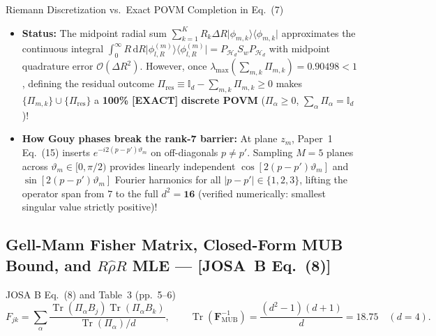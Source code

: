 \documentclass[10pt,letterpaper]{article}
\newcommand{\ket}[1]{\lvert #1 \rangle}
\newcommand{\bra}[1]{\langle #1 \rvert}
\newcommand{\abs}[1]{\lvert #1 \rvert}
\newcommand{\dd}{\mathrm{d}}
\newcommand{\josb}[1]{\textbf{[JOSA~B Eq.~(#1)]}}
\newcommand{\tagexact}{\textcolor{forest}{\textbf{[EXACT]}}}
\numberwithin{equation}{section}
\begin{document}
\begin{approxbox}{Riemann Discretization vs.\ Exact POVM Completion in Eq.~(7)}
\begin{itemize}[leftmargin=1.4em,itemsep=2pt,topsep=1pt]
  \item \textbf{Status:} The midpoint radial sum $\sum_{k=1}^K R_k\Delta R\ket{\phi_{m,k}}\bra{\phi_{m,k}}$ approximates the continuous integral $\int_0^\infty R\,\dd R\ket{\phi_{l,R}^{(m)}}\bra{\phi_{l,R}^{(m)}} = P_{\mathcal{H}_d} S_w P_{\mathcal{H}_d}$ with midpoint quadrature error $\mathcal{O}(\Delta R^2)$. However, once $\lambda_{\max}(\sum_{m,k}\Pi_{m,k}) = 0.90498 < 1$, defining the residual outcome $\Pi_{\mathrm{res}} \equiv \mathbb{I}_d - \sum_{m,k}\Pi_{m,k} \ge 0$ makes $\{\Pi_{m,k}\}\cup\{\Pi_{\mathrm{res}}\}$ a \textbf{100\%} \tagexact{} \textbf{discrete POVM} ($\Pi_\alpha \ge 0$, $\sum_\alpha\Pi_\alpha = \mathbb{I}_d$)!
  \item \textbf{How Gouy phases break the rank-7 barrier:} At plane $z_m$, Paper~1 Eq.~(15) inserts $e^{-i 2(p-p')\vartheta_m}$ on off-diagonals $p \neq p'$. Sampling $M = 5$ planes across $\vartheta_m \in [0,\pi/2)$ provides linearly independent $\cos[2(p-p')\vartheta_m]$ and $\sin[2(p-p')\vartheta_m]$ Fourier harmonics for all $\abs{p-p'} \in \{1,2,3\}$, lifting the operator span from $7$ to the full $d^2 = \mathbf{16}$ (verified numerically: smallest singular value strictly positive)!
\end{itemize}
\end{approxbox}

\subsection{Gell-Mann Fisher Matrix, Closed-Form MUB Bound, and $R\hat{\rho}R$ MLE --- \josb{8}}

\begin{targeteq}{JOSA B Eq.~(8) and Table~3 (pp.~5--6)}
\[
  F_{jk} = \sum_\alpha \frac{\operatorname{Tr}(\Pi_\alpha B_j)\operatorname{Tr}(\Pi_\alpha B_k)}{\operatorname{Tr}(\Pi_\alpha)/d}, \qquad
  \operatorname{Tr}(\mathbf{F}_{\mathrm{MUB}}^{-1}) = \frac{(d^2-1)(d+1)}{d} = 18.75 \quad (d = 4).
\]
\end{targeteq}
\end{document}
